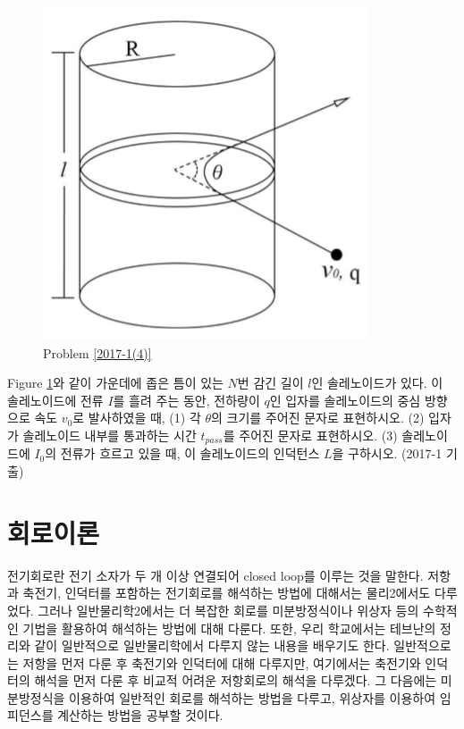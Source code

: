 \begin{problem}\label{2017-1(4)}
\begin{figure}[h]
\centering\includegraphics[scale=0.4]{Pictures/2017-1(4).PNG}
\caption{Problem \ref{2017-1(4)}}
\label{fig:2017-1(4)}
\end{figure}
Figure \ref{fig:2017-1(4)}와 같이 가운데에 좁은 틈이 있는 $N$번 감긴 길이 $l$인 솔레노이드가 있다. 이 솔레노이드에 전류 $I$를 흘려 주는 동안, 전하량이 $q$인 입자를 솔레노이드의 중심 방향으로 속도 $v_0$로 발사하였을 때, 
(1) 각 $θ$의 크기를 주어진 문자로 표현하시오. (2) 입자가 솔레노이드 내부를 통과하는 시간 $t_{pass}$를 주어진 문자로 표현하시오. (3) 솔레노이드에 $I_0$의 전류가 흐르고 있을 때, 이 솔레노이드의 인덕턴스 $L$을 구하시오.
(2017-1 기출)
\end{problem}

\chapter{회로이론}
전기회로란 전기 소자가 두 개 이상 연결되어 closed loop를 이루는 것을 말한다. 저항과 축전기, 인덕터를 포함하는 전기회로를 해석하는 방법에 대해서는 물리2에서도 다루었다. 그러나 일반물리학2에서는 더 복잡한 회로를 미분방정식이나 위상자 등의 수학적인 기법을 활용하여 해석하는 방법에 대해 다룬다. 또한, 우리 학교에서는 테브난의 정리와 같이 일반적으로 일반물리학에서 다루지 않는 내용을 배우기도 한다.
일반적으로는 저항을 먼저 다룬 후 축전기와 인덕터에 대해 다루지만, 여기에서는 축전기와 인덕터의 해석을 먼저 다룬 후 비교적 어려운 저항회로의 해석을 다루겠다. 그 다음에는 미분방정식을 이용하여 일반적인 회로를 해석하는 방법을 다루고, 위상자를 이용하여 임피던스를 계산하는 방법을 공부할 것이다.
